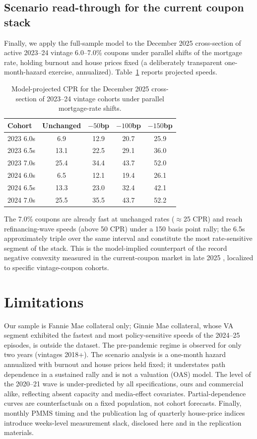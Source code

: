 \documentclass[11pt]{article}
\begin{document}
\subsection{Scenario read-through for the current coupon stack}
\label{sec:e3}

Finally, we apply the full-sample model to the December 2025 cross-section of active 2023--24
vintage 6.0--7.0\% coupons under parallel shifts of the mortgage rate, holding burnout and
house prices fixed (a deliberately transparent one-month-hazard exercise, annualized).
Table~\ref{tab:e3} reports projected speeds.

\begin{table}[ht]
\centering
\small
\begin{tabular}{lcccc}
\toprule
Cohort & Unchanged & $-50$bp & $-100$bp & $-150$bp \\
\midrule
2023 6.0s & 6.9 & 12.9 & 20.7 & 25.9 \\
2023 6.5s & 13.1 & 22.5 & 29.1 & 36.0 \\
2023 7.0s & 25.4 & 34.4 & 43.7 & 52.0 \\
2024 6.0s & 6.5 & 12.1 & 19.4 & 26.1 \\
2024 6.5s & 13.3 & 23.0 & 32.4 & 42.1 \\
2024 7.0s & 25.5 & 35.5 & 43.7 & 52.2 \\
\bottomrule
\end{tabular}
\caption{Model-projected CPR for the December 2025 cross-section of 2023--24 vintage cohorts
under parallel mortgage-rate shifts.}
\label{tab:e3}
\end{table}

The 7.0\% coupons are already fast at unchanged rates ($\approx$25 CPR) and reach
refinancing-wave speeds (above 50 CPR) under a 150 basis point rally; the 6.5s approximately
triple over the same interval and constitute the most rate-sensitive segment of the stack. This is the model-implied
counterpart of the record negative convexity measured in the current-coupon market in late 2025
\citep{katz2024models}, localized to specific vintage-coupon cohorts.

\section{Limitations}
\label{sec:limitations}

Our sample is Fannie Mae collateral only; Ginnie Mae collateral, whose VA segment exhibited the
fastest and most policy-sensitive speeds of the 2024--25 episodes, is outside the dataset.
The pre-pandemic regime is observed for only two years (vintages 2018+). The scenario analysis
is a one-month hazard annualized with burnout and house prices held fixed; it understates path
dependence in a sustained rally and is not a valuation (OAS) model. The level of the 2020--21
wave is under-predicted by all specifications, ours and commercial alike, reflecting absent
capacity and media-effect covariates. Partial-dependence curves are counterfactuals on a fixed
population, not cohort forecasts. Finally, monthly PMMS timing and the publication lag of
quarterly house-price indices introduce weeks-level measurement slack, disclosed here and in the
replication materials.
\end{document}
